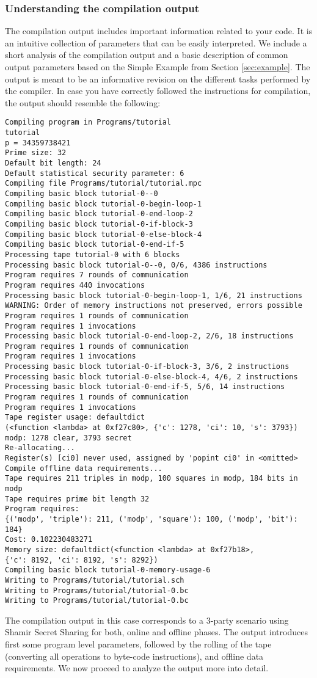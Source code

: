 \subsubsection{Understanding the compilation output}

The compilation output includes important information related to your code. 
It is an intuitive collection of parameters that can be easily interpreted. 
We include a short analysis of the compilation output and a basic description of common output parameters based on the Simple Example from  Section \ref{sec:example}.
 The output is meant to be an informative revision on the different tasks performed by the compiler. In case you have correctly followed the instructions for compilation, the output should resemble the following: 

\begin{verbatim}
Compiling program in Programs/tutorial
tutorial
p = 34359738421
Prime size: 32
Default bit length: 24
Default statistical security parameter: 6
Compiling file Programs/tutorial/tutorial.mpc
Compiling basic block tutorial-0--0
Compiling basic block tutorial-0-begin-loop-1
Compiling basic block tutorial-0-end-loop-2
Compiling basic block tutorial-0-if-block-3
Compiling basic block tutorial-0-else-block-4
Compiling basic block tutorial-0-end-if-5
Processing tape tutorial-0 with 6 blocks
Processing basic block tutorial-0--0, 0/6, 4386 instructions
Program requires 7 rounds of communication
Program requires 440 invocations
Processing basic block tutorial-0-begin-loop-1, 1/6, 21 instructions
WARNING: Order of memory instructions not preserved, errors possible
Program requires 1 rounds of communication
Program requires 1 invocations
Processing basic block tutorial-0-end-loop-2, 2/6, 18 instructions
Program requires 1 rounds of communication
Program requires 1 invocations
Processing basic block tutorial-0-if-block-3, 3/6, 2 instructions
Processing basic block tutorial-0-else-block-4, 4/6, 2 instructions
Processing basic block tutorial-0-end-if-5, 5/6, 14 instructions
Program requires 1 rounds of communication
Program requires 1 invocations
Tape register usage: defaultdict
(<function <lambda> at 0xf27c80>, {'c': 1278, 'ci': 10, 's': 3793})
modp: 1278 clear, 3793 secret
Re-allocating...
Register(s) [ci0] never used, assigned by 'popint ci0' in <omitted>
Compile offline data requirements...
Tape requires 211 triples in modp, 100 squares in modp, 184 bits in modp
Tape requires prime bit length 32
Program requires: 
{('modp', 'triple'): 211, ('modp', 'square'): 100, ('modp', 'bit'): 184}
Cost: 0.102230483271
Memory size: defaultdict(<function <lambda> at 0xf27b18>, 
{'c': 8192, 'ci': 8192, 's': 8292})
Compiling basic block tutorial-0-memory-usage-6
Writing to Programs/tutorial/tutorial.sch
Writing to Programs/tutorial/tutorial-0.bc
Writing to Programs/tutorial/tutorial-0.bc
\end{verbatim}
The compilation output in this case corresponds  to a 3-party scenario using Shamir Secret Sharing for both, online and offline phases. 
The output introduces first some program level parameters, followed by the rolling of the tape (converting all operations to byte-code instructions), and offline data requirements. We now proceed to analyze the output more into detail.

